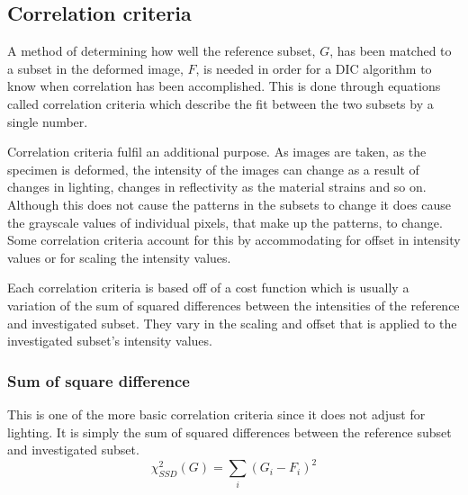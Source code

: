\subsection{Correlation criteria}
A method of determining how well the reference subset, $G$, has been matched to a subset in the deformed image, $F$, is needed in order for a DIC algorithm to know when correlation has been accomplished. This is done through equations called correlation criteria which describe the fit between the two subsets by a single number. 

Correlation criteria fulfil an additional purpose. As images are taken, as the specimen is deformed, the intensity of the images can change as a result of changes in lighting, changes in reflectivity as the material strains and so on. Although this does not cause the patterns in the subsets to change it does cause the grayscale values of individual pixels, that make up the patterns, to change. Some correlation criteria account for this by accommodating for offset in intensity values or for scaling the intensity values.

Each correlation criteria is based off of a cost function which is usually a variation of the sum of squared differences between the intensities of the reference and investigated subset. They vary in the scaling and offset that is applied to the investigated subset's intensity values. 

\subsubsection{Sum of square difference}
This is one of the more basic correlation criteria since it does not adjust for lighting. It is simply the sum of squared differences between the reference subset and investigated subset.
\begin{equation}
\chi_{SSD}^2 (G) = \sum_{i} \left( G_i -F_i \right) ^2
\end{equation}

